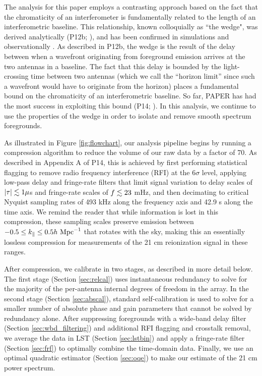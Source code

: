 \documentclass[twocolumn,numberedappendix]{emulateapj} \shorttitle{New Limits on the 21 cm Power Spectrum at $z=8.4$}
\newcommand{\hMpci}{h\ {\rm Mpc}^{-1}}
\begin{document}
The analysis for this paper employs a contrasting
approach based on the fact that the chromaticity of an interferometer
is fundamentally related to the length of an interferometric baseline.  This relationship, known
colloquially as ``the wedge", was 
derived analytically (P12b; \citealt{vedantham_et_al2012,nithya_et_al2013,liu_et_al2014a,liu_et_al2014b}), and has been confirmed in 
simulations \citep{datta_et_al2010,hazelton_et_al2013} and observationally
\citep{pober_et_al2013,dillon_et_al2013b}.  As described in P12b, the wedge is the result of the delay
between when a wavefront originating from foreground emission
arrives at the two antennas in a baseline.  The fact that this delay is bounded by the light-crossing
time between two antennas (which we call the ``horizon limit'' since such a wavefront would have to 
originate from the horizon) places a fundamental bound on the chromaticity of
an interferometric baseline.  So far, PAPER has had the most success in exploiting this bound
(P14; \citealt{jacobs_et_al2014}). 
In this analysis, we continue to use the properties of the 
wedge in order to isolate and remove smooth
spectrum foregrounds.

As illustrated in Figure \ref{fig:flowchart},
our analysis pipeline begins by running a compression
algorithm to reduce the volume of our raw data by a factor of 70.
As described in Appendix A of P14, this is achieved by first performing statistical flagging to remove
radio frequency interference (RFI) at the 6$\sigma$ level, applying low-pass delay and fringe-rate filters that limit signal variation
to delay scales of $|\tau|\lesssim1 \mu$s and fringe-rate scales of $f\lesssim23$ mHz, and then 
decimating to critical Nyquist sampling rates of 493 kHz along the frequency axis
and 42.9 s along the time axis.  We remind the reader that while information is lost in this compression,
these sampling scales preserve emission between
$-0.5\le k_\parallel\le 0.5\hMpci$ that rotates with the sky, making this an essentially lossless compression 
for measurements of the 21 cm reionization signal in these ranges.

After compression, we calibrate in two stages, as described in more detail below.  
The first stage (Section \ref{sec:relcal}) uses instantaneous redundancy to solve for the majority of the 
per-antenna internal degrees of freedom in the array.  In the second stage (Section \ref{sec:abscal}), standard self-calibration is used 
to solve for a smaller number of
absolute phase and gain parameters that cannot be solved by redundancy alone. 
After suppressing foregrounds with a
wide-band delay filter (Section \ref{sec:wbd_filtering}) and additional RFI flagging and crosstalk removal, 
we average the data in LST (Section \ref{sec:lstbin}) and apply a
fringe-rate filter (Section \ref{sec:frf}) to optimally combine the time-domain data. 
Finally, we use an
optimal quadratic estimator (Section \ref{sec:oqe}) to make our estimate of the 21 cm power spectrum.
\end{document}
